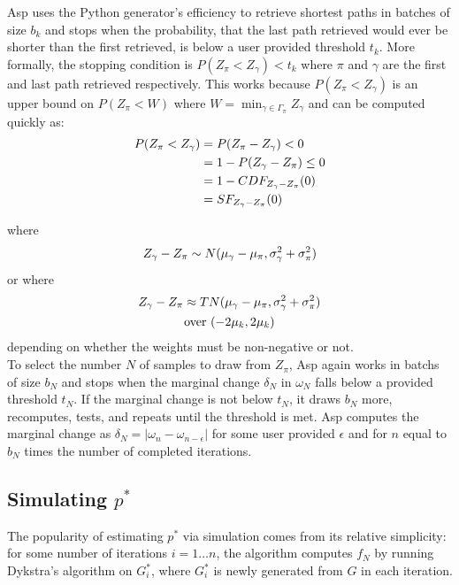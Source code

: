 \documentclass[twocolumn]{article}
\begin{document}
Asp uses the Python generator's efficiency to retrieve shortest paths in batches of size $b_{k}$ and stops when the probability, that the last path retrieved would ever be shorter than the first retrieved, is below a user provided threshold $t_{k}$.  More formally, the stopping condition is $P(Z_{\pi} < Z_{\gamma}) < t_{k} $ where $\pi$  and $\gamma$ are the first and last path retrieved respectively. This works because $P(Z_{\pi} < Z_{\gamma})$ is an upper bound on $P(Z_{\pi}<W)$ where $W =  \min_{\gamma \in \Gamma_{\pi}} Z_{\gamma}$ and can be computed quickly as:
\begin{align}
P(Z_{\pi} < Z_{\gamma}) &=  P(Z_{\pi} - Z_{\gamma}) < 0 \notag \\ 
&= 1 - P(Z_{\gamma} - Z_{\pi}) \leq 0 \notag \\ 
&= 1 - CDF_{Z_{\gamma} - Z_{\pi}}(0) \notag \\ 
&= SF_{Z_{\gamma} - Z_{\pi}}(0) \notag
\end{align}

where
\begin{align}
Z_{\gamma} - Z_{\pi} \sim N(\mu_{\gamma}-\mu_{\pi},\sigma_{\gamma}^{2}+\sigma_{\pi}^{2}) \notag
\end{align}
or 
where
\begin{gather}
Z_{\gamma} - Z_{\pi} \approx TN(\mu_{\gamma}-\mu_{\pi},\sigma_{\gamma}^{2}+\sigma_{\pi}^{2}) \notag \\
\text{over } (-2\mu_{k},2\mu_{k}) \notag
\end{gather}
depending on whether the weights must be non-negative or not.\\

To select the number $N$ of samples to draw from $Z_{\pi}$, Asp again works in batchs of size $b_{N}$ and stops when the marginal change $\delta_{N}$ in $\omega_N$ falls below a provided threshold  $t_{N}$. If the marginal change is not below $t_{N}$, it draws $b_{N}$ more, recomputes, tests, and repeats until the threshold is met. Asp computes the marginal change as $\delta_{N} = \lvert  \omega_n - \omega_{n-\epsilon} \rvert$ for some user provided $\epsilon$ and for $n$ equal to $b_{N}$ times the number of completed iterations.


\subsection{Simulating $p^{*}$}
The popularity of estimating $p^{*}$ via simulation comes from its relative simplicity: for some number of iterations $i = 1 \dots n$, the algorithm computes $f_N$ by running Dykstra's algorithm on $G^{*}_{i}$, where $G^{*}_{i}$ is newly generated from $G$ in each iteration.
\end{document}
